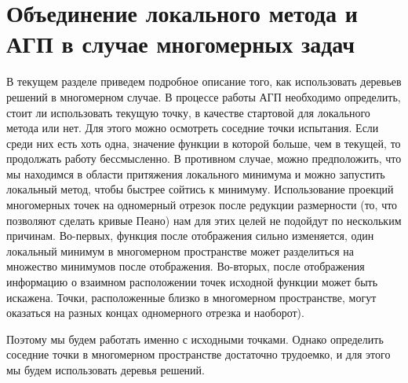 \documentclass[12pt, a4paper, russian]{article}
\begin{document}
\section{Объединение локального метода и АГП в случае многомерных задач}

В текущем разделе приведем подробное описание того, как использовать деревьев решений в многомерном случае. В процессе работы АГП необходимо определить, стоит ли использовать текущую точку, в качестве стартовой для локального метода или нет. Для этого можно осмотреть соседние точки испытания. Если среди них есть хоть одна, значение функции в которой больше, чем в текущей, то продолжать работу бессмысленно. В противном случае, можно предположить, что мы находимся в области притяжения локального минимума и можно запустить локальный метод, чтобы быстрее сойтись к минимуму. Использование проекций многомерных точек на одномерный отрезок после редукции размерности (то, что позволяют сделать кривые Пеано) нам для этих целей не подойдут по нескольким причинам. Во-первых, функция после отображения сильно изменяется, один локальный минимум в многомерном пространстве может разделиться на множество минимумов после отображения. Во-вторых, после отображения информацию о взаимном расположении точек исходной функции может быть искажена. Точки, расположенные близко в многомерном пространстве, могут оказаться на разных концах одномерного отрезка и наоборот).




Поэтому мы будем работать именно с исходными точками. Однако определить соседние точки в многомерном пространстве достаточно трудоемко, и для этого мы будем использовать деревья решений. 
\end{document}

